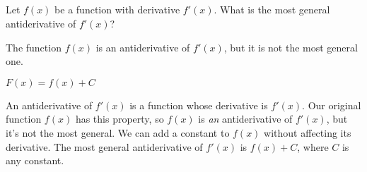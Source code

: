%
%
\subsection*{\Conceptual}

\begin{question}
Let $f(x)$ be  a function with derivative $f'(x)$. What is the most general antiderivative of $f'(x)$?
\end{question}
\begin{hint}
The function $f(x)$ is an antiderivative of $f'(x)$, but it is not the most general one.
\end{hint}
\begin{answer}
$F(x)=f(x)+C$
\end{answer}
\begin{solution}
An antiderivative of $f'(x)$ is a function whose derivative is $f'(x)$. Our original function $f(x)$ has this property, so $f(x)$ is \emph{an} antiderivative of $f'(x)$, but it's not the most general. We can add a constant to $f(x)$ without affecting its derivative. The most general antiderivative of $f'(x)$ is $f(x)+C$, where $C$ is any constant.
\end{solution}


